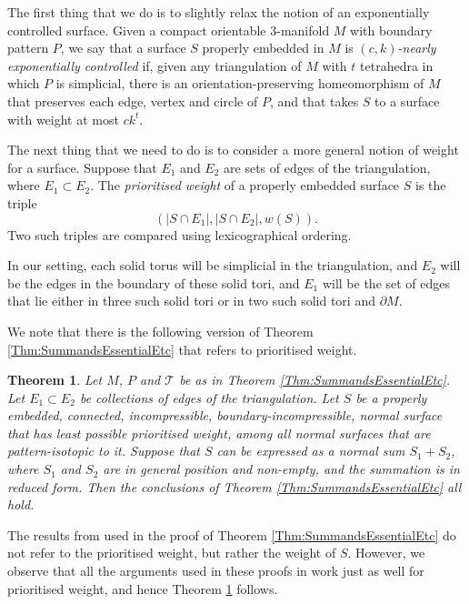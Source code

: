 \documentclass[oneside]{amsart}
\numberwithin{equation}{section}
\theoremstyle{plain}
\newtheorem{theorem}[equation]{Theorem}
\theoremstyle{definition}
\begin{document}
The first thing that we do is to slightly relax the notion of an exponentially controlled surface. Given a compact orientable 3-manifold $M$ with boundary pattern $P$,
we say that a surface $S$ properly embedded in $M$ is \emph{$(c,k)$-nearly exponentially controlled} if, given any triangulation of $M$ with $t$ tetrahedra in which $P$ is simplicial, there is an orientation-preserving homeomorphism of $M$ that preserves each edge, vertex and circle of $P$, and that takes $S$ to a surface with weight at most $ck^t$.

The next thing that we need to do is to consider a more general notion of weight for a surface.
Suppose that $E_1$ and $E_2$ are sets of edges of the triangulation, where $E_1 \subset E_2$. 
The \emph{prioritised weight} of a properly embedded surface $S$ is the triple 
$$(|S \cap E_1|, |S \cap E_2|, w(S)).$$ 
Two such triples are compared using lexicographical ordering.

In our setting, each solid torus will be simplicial in the triangulation, and $E_2$ will be the edges in the boundary of these solid tori,
and $E_1$ will be the set of edges that lie either in three such solid tori or in two such solid tori and $\partial M$.

We note that there is the following version of Theorem \ref{Thm:SummandsEssentialEtc} that refers to prioritised weight.

\begin{theorem}
\label{Thm:SummandsPrioritised}
Let $M$, $P$ and $\mathcal{T}$ be as in Theorem \ref{Thm:SummandsEssentialEtc}. Let $E_1 \subset E_2$ be collections of edges of the triangulation.
Let $S$ be a properly embedded, connected, incompressible, boundary-incompressible, normal surface that has least possible prioritised weight,
among all normal surfaces that are pattern-isotopic to it. Suppose that $S$ can be expressed as a normal sum $S_1 + S_2$,
where $S_1$ and $S_2$ are in general position and non-empty, and the summation is in reduced form. Then the conclusions 
of Theorem  \ref{Thm:SummandsEssentialEtc} all hold.
\end{theorem}

The results from \cite{Matveev} used in the proof of Theorem \ref{Thm:SummandsEssentialEtc} do not refer to the prioritised weight, 
but rather the weight of $S$. However, we observe
that all the arguments used in these proofs in \cite{Matveev} work just as well for prioritised weight,
and hence Theorem \ref{Thm:SummandsPrioritised} follows.
\end{document}
